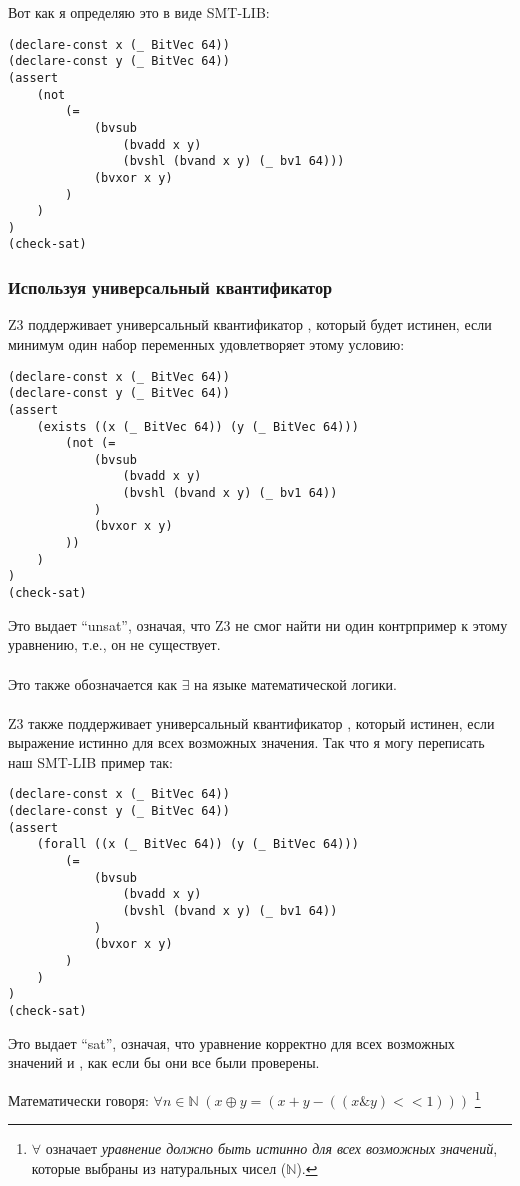 Вот как я определяю это в виде SMT-LIB:

\begin{lstlisting}
(declare-const x (_ BitVec 64))
(declare-const y (_ BitVec 64))
(assert 
	(not
		(=
			(bvsub
				(bvadd x y)
				(bvshl (bvand x y) (_ bv1 64)))
			(bvxor x y)
		)
	)
)
(check-sat)
\end{lstlisting}

\subsubsection{Используя универсальный квантификатор}

Z3 поддерживает универсальный квантификатор , который будет истинен,
если минимум один набор переменных удовлетворяет этому условию:

\begin{lstlisting}
(declare-const x (_ BitVec 64))
(declare-const y (_ BitVec 64))
(assert 
	(exists ((x (_ BitVec 64)) (y (_ BitVec 64)))
		(not (=
			(bvsub 
				(bvadd x y)
				(bvshl (bvand x y) (_ bv1 64))
			)
			(bvxor x y)
		))
	)
)
(check-sat)
\end{lstlisting}

Это выдает ``unsat'', означая, что Z3 не смог найти ни один контрпример к этому уравнению, т.е., он не существует.\\
\\
Это также обозначается как $\exists$ на языке математической логики.\\
\\
Z3 также поддерживает универсальный квантификатор , который истинен, если выражение истинно
для всех возможных значения.
Так что я могу переписать наш SMT-LIB пример так:

\begin{lstlisting}
(declare-const x (_ BitVec 64))
(declare-const y (_ BitVec 64))
(assert 
	(forall ((x (_ BitVec 64)) (y (_ BitVec 64)))
		(=
			(bvsub 
				(bvadd x y)
				(bvshl (bvand x y) (_ bv1 64))
			)
			(bvxor x y)
		)
	)
)
(check-sat)
\end{lstlisting}

Это выдает ``sat'', означая, что уравнение корректно для всех возможных значений  и ,
как если бы они все были проверены.

Математически говоря: $\forall n\!\in\!\mathbb{N}\; (x \oplus y = (x + y - ((x \& y)<<1)))$
\footnote{
$\forall$ означает \textit{уравнение должно быть истинно для всех возможных значений}, которые выбраны из натуральных
чисел ($\mathbb{N}$).}

